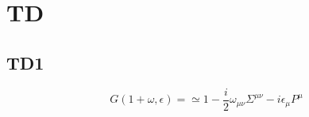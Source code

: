 \documentclass[a4paper]{book}
\theoremstyle{definition}
\theoremstyle{remark}
\begin{document}
\chapter{TD}

\section{TD1}

\begin{equation}
    G(1+\omega, \epsilon) = \simeq 1 - \frac{i}{2}\omega_{\mu\nu}\Sigma^{\mu\nu} - i\epsilon_\mu P^\mu 
\end{equation}
\end{document}

